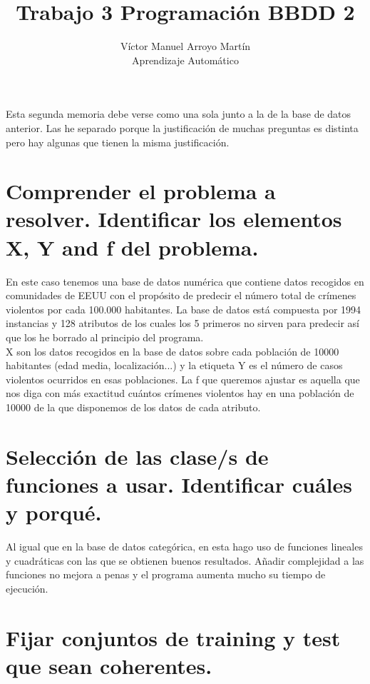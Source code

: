\documentclass[12pt]{article}
\date{}
\begin{document}
 
 
\title{Trabajo 3 Programación BBDD 2}
\author{Víctor Manuel Arroyo Martín\\ %
Aprendizaje Automático}

\maketitle

Esta segunda memoria debe verse como una sola junto a la de la base de datos anterior. Las he separado porque la justificación de muchas preguntas es distinta pero hay algunas que tienen la misma justificación.

\section{Comprender el problema a resolver. Identificar los elementos X, Y and f del problema.}
En este caso tenemos una base de datos numérica que contiene datos recogidos en comunidades de EEUU con el propósito de predecir el número total de crímenes violentos por cada 100.000 habitantes. La base de datos está compuesta por 1994 instancias y 128 atributos de los cuales los 5 primeros no sirven para predecir así que los he borrado al principio del programa.\\
 X son los datos recogidos en la base de datos sobre cada población de 10000 habitantes (edad media, localización...) y la etiqueta Y es el número de casos violentos ocurridos en esas poblaciones. La f que queremos ajustar es aquella que nos diga con más exactitud cuántos crímenes violentos hay en una población de 10000 de la que disponemos de los datos de cada atributo.

\section{Selección de las clase/s de funciones a usar. Identificar cuáles y porqué.}

Al igual que en la base de datos categórica, en esta hago uso de funciones lineales y cuadráticas con las que se obtienen buenos resultados. Añadir complejidad a las funciones no mejora a penas y el programa aumenta mucho su tiempo de ejecución.

\section{Fijar conjuntos de training y test que sean coherentes.}
\end{document}
